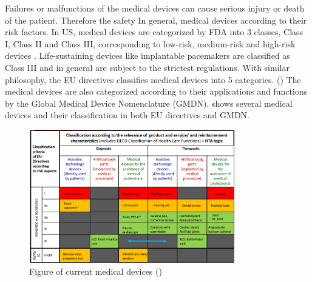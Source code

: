 Failures or malfunctions of the medical devices can cause serious injury or death of the patient. Therefore the safety
In general, medical devices according to their risk factors. In US, medical devices are categorized by FDA into 3 classes, Class I, Class II and Class III, corresponding to low-risk, medium-risk and high-risk devices \cite{class}. Life-sustaining devices like implantable pacemakers are classified as Class III and in general are subject to the strictest regulations. With similar philosophy, the EU directives classifies medical devices into 5 categories. (\cite{EU_classify}) The medical devices are also categorized according to their applications and functions by the Global Medical Device Nomenclature (GMDN).  shows several medical devices and their classification in both EU directives and GMDN.
\begin{figure}[t]
		\centering
		\includegraphics[width=0.8\textwidth]{figs/devices.png}
		\caption{\small Figure of current medical devices (\cite{GMDN})}
		\label{fig:Cur}
\end{figure}

